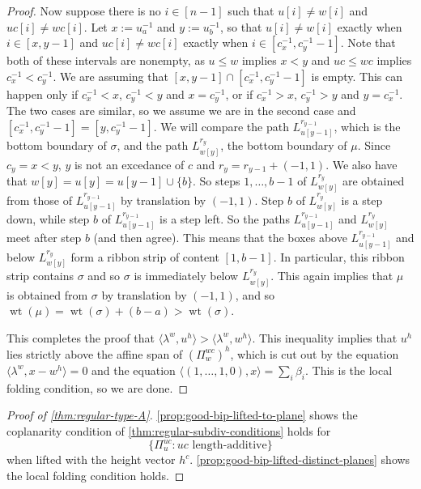 \documentclass[11pt]{amsart}
\theoremstyle{definition}
\DeclareMathOperator{\wt}{wt}
\def\lin{\lambda}
\def\hgt{h}
\def\hc{\hgt^c}
\def\path{L}
\def\pt{\beta}
\begin{document}
\begin{proof}
	Now suppose there is no $i \in [n-1]$ such that $u[i] \neq w[i]$ and $uc[i] \neq wc[i]$. Let $x:=u^{-1}_a$ and $y:=u^{-1}_b$, so that $u[i] \neq w[i]$ exactly when $i \in [x, y-1]$ and $uc[i] \neq wc[i]$ exactly when $i \in [c^{-1}_x, c^{-1}_y-1]$. Note that both of these intervals are nonempty, as $u \le w$ implies $x<y$ and $uc \le wc$ implies $c^{-1}_x<c^{-1}_y$. We are assuming that $[x,y-1] \cap [c^{-1}_x, c^{-1}_y -1]$ is empty. This can happen only if $c^{-1}_x<x$, $c^{-1}_y<y$ and $x=c^{-1}_y$, or if $c^{-1}_x>x$, $c^{-1}_y>y$ and $y=c^{-1}_x$. The two cases are similar, so we assume we are in the second case and $[c^{-1}_x, c^{-1}_y -1]= [y, c^{-1}_y-1]$. We will compare the path $\path_{u[y-1]}^{r_{y-1}}$, which is the bottom boundary of $\sigma$, and the path $\path_{w[y]}^{r_{y}}$, the bottom boundary of $\mu$. Since $c_y=x <y$, $y$ is not an excedance of $c$ and $r_{y}= r_{y-1}+(-1,1)$. We also have that $w[y]=u[y]= u[y-1] \cup \{b\}$. So steps $1, \dots, b-1$ of $\path_{w[y]}^{r_y}$ are obtained from those of $\path_{u[y-1]}^{r_{y-1}}$ by translation by $(-1,1)$. Step $b$ of $\path_{w[y]}^{r_y}$ is a step down, while step $b$ of $\path_{u[y-1]}^{r_{y-1}}$ is a step left. So the paths $\path_{u[y-1]}^{r_{y-1}}$ and $\path_{w[y]}^{r_y}$ meet after step $b$ (and then agree). This means that the boxes above $\path_{u[y-1]}^{r_{y-1}}$ and below $\path_{w[y]}^{r_y}$ form a ribbon strip of content $[1, b-1]$. In particular, this ribbon strip contains $\sigma$ and so $\sigma$ is immediately below $\path_{w[y]}^{r_y}$. This again implies that $\mu$ is obtained from $\sigma$ by translation by $(-1,1)$, and so $\wt(\mu)= \wt(\sigma) + (b-a)>\wt(\sigma)$.
	
	This completes the proof that $\langle \lin^w, u^{\hgt} \rangle > \langle \lin^w, w^{\hgt} \rangle$. This inequality implies that $u^{\hgt}$ lies strictly above the affine span of $(\Pi_{w}^{wc})^{\hgt}$, which is cut out by the equation $\langle \lin^w, x-w^h \rangle=0$ and the equation $\langle (1, \dots, 1, 0), x \rangle = \sum_i \pt_i$. This is the local folding condition, so we are done.
\end{proof}

\begin{proof}[Proof of \cref{thm:regular-type-A}]
	\cref{prop:good-bip-lifted-to-plane} shows the coplanarity condition of \cref{thm:regular-subdiv-conditions} holds for 
	\[\{\Pi_u^{uc}: uc \text{ length-additive}\}\]
	when lifted with the height vector $\hc$. \cref{prop:good-bip-lifted-distinct-planes} shows the local folding condition holds.
\end{proof}
\end{document}
